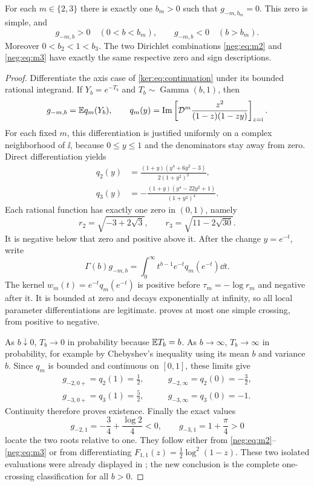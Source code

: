 \begin{theorem}
\label{neg:thm:transitions}
For each $m\in\{2,3\}$ there is exactly one $b_m>0$ such that
$g_{-m,b_m}=0$. This zero is simple, and
\begin{equation}\label{neg:eq:signs}
 g_{-m,b}>0\quad(0<b<b_m),\qquad
 g_{-m,b}<0\quad(b>b_m).
\end{equation}
Moreover $0<b_2<1<b_3$. The two Dirichlet combinations
\eqref{neg:eq:m2} and \eqref{neg:eq:m3} have exactly the same
respective zero and sign descriptions.
\end{theorem}
\begin{proof}
Differentiate the axis case of \eqref{ker:eq:continuation} under its
bounded rational integrand. If $Y_b=e^{-T_b}$ and
$T_b\sim\operatorname{Gamma}(b,1)$, then
\[
 g_{-m,b}=\mathbb E q_m(Y_b),\qquad
 q_m(y)=\operatorname{Im}\left[
   \mathcal D^m\frac{z^2}{(1-z)(1-zy)}\right]_{z=\mathrm i}.
\]
For each fixed $m$, this differentiation is justified uniformly on a
complex neighborhood of $\ii$, because $0\le y\le1$ and the
denominators stay away from zero. Direct differentiation yields
\begin{align}
 q_2(y)&=\frac{(1+y)(y^4+6y^2-3)}{2(1+y^2)^3},\label{neg:eq:q2}\\
 q_3(y)&=-\frac{(1+y)(y^4-22y^2+1)}{(1+y^2)^4}.
                    \label{neg:eq:q3}
\end{align}
Each rational function has exactly one zero in $(0,1)$, namely
\[
 r_2=\sqrt{-3+2\sqrt3},\qquad
 r_3=\sqrt{11-2\sqrt{30}}.
\]
It is negative below that zero and positive above it. After the change
$y=e^{-t}$, write
\begin{equation}\label{neg:eq:mellin}
 \Gamma(b)g_{-m,b}=\int_0^\infty
          t^{b-1}e^{-t}q_m(e^{-t})\dd t.
\end{equation}
The kernel $w_m(t)=e^{-t}q_m(e^{-t})$ is positive before
$\tau_m=-\log r_m$ and negative after it. It is bounded at zero
and decays exponentially at infinity, so all local parameter
differentiations are legitimate.  proves at most
one simple crossing, from positive to negative.

As $b\downarrow0$, $T_b\to0$ in probability because $\mathbb E T_b=b$.
As $b\to\infty$, $T_b\to\infty$ in probability, for example by
Chebyshev's inequality using its mean $b$ and variance $b$.
Since $q_m$ is bounded and continuous on $[0,1]$, these limits give
\begin{align*}
 g_{-2,0+}=q_2(1)=\tfrac12,&\qquad
 g_{-2,\infty}=q_2(0)=-\tfrac32,\\
 g_{-3,0+}=q_3(1)=\tfrac52,&\qquad
 g_{-3,\infty}=q_3(0)=-1.
\end{align*}
Continuity therefore proves existence. Finally the exact values
\[
 g_{-2,1}=-\frac34+\frac{\log2}{4}<0,
 \qquad g_{-3,1}=1+\frac\pi4>0
\]
locate the two roots relative to one. They follow either from
\eqref{neg:eq:m2}--\eqref{neg:eq:m3} or from differentiating
$F_{1,1}(z)=\tfrac12\log^2(1-z)$. These two isolated evaluations
were already displayed in \cite[Section 6]{IncomingSharp}; the new
conclusion is the complete one-crossing classification for all $b>0$.
\end{proof}

